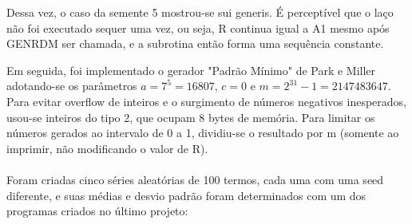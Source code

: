 \message{ !name(relatorio.tex)}\documentclass{article}
\begin{document}
Dessa vez, o caso da semente 5 mostrou-se sui generis. É perceptível que o laço não foi executado sequer uma vez, ou seja, R continua igual a A1 mesmo após GENRDM ser chamada, e a subrotina então forma uma sequência constante.

Em seguida, foi implementado o gerador "Padrão Mínimo" de Park e Miller adotando-se os parâmetros \(a = 7^5 = 16807\), \(c = 0\) e \(m = 2^{31}-1 = 2147483647\). Para evitar overflow de inteiros e o surgimento de números negativos inesperados, usou-se inteiros do tipo 2, que ocupam 8 bytes de memória. Para limitar os números gerados ao intervalo de 0 a 1, dividiu-se o resultado por m (somente ao imprimir, não modificando o valor de R).\paragraph{}
Foram criadas cinco séries aleatórias de 100 termos, cada uma com uma seed diferente, e suas médias e desvio padrão foram determinados com um dos programas criados no último projeto:
\end{document}
